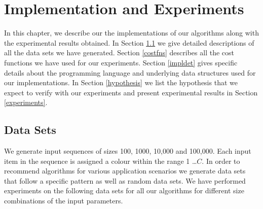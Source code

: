 \chapter{Implementation and Experiments} \label{implementation}

In this chapter, we describe our the implementations of our algorithms along with the experimental results obtained. In Section \ref{dataSets} we give detailed descriptions of all the data sets we have generated. Section \ref{costfns} describes all the cost functions we have used for our experiments. Section \ref{impldet} gives specific details about the programming language and underlying data structures used for our implementations. In Section \ref{hypothesis} we list the hypothesis that we expect to verify with our experiments and present experimental results in Section \ref{experiments}. 

\section{Data Sets} \label{dataSets}
We generate input sequences of sizes 100, 1000, 10,000 and 100,000. Each input item in the sequence is assigned a colour within the range 1 \ldots $C$. In order to recommend algorithms for various application scenarios we generate data sets that follow a specific pattern as well as random data sets. We have performed experiments on the following data sets for all our algorithms for different size combinations of the input parameters.

